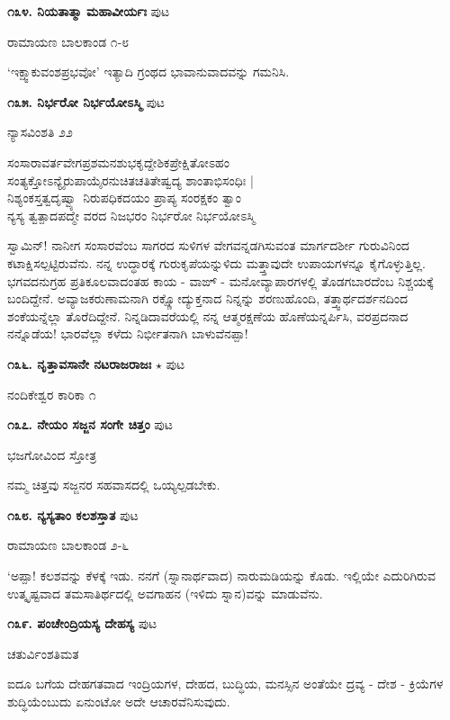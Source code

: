 \medskip
\noindent\textbf{೧೩೪. ನಿಯತಾತ್ಮಾ ಮಹಾವೀರ್ಯಃ} \hfill ಪುಟ \pageref{247b}

\hfill ರಾಮಾಯಣ ಬಾಲಕಾಂಡ ೧-೮

`ಇಕ್ಷ್ವಾಕುವಂಶಪ್ರಭವೋ' ಇತ್ಯಾದಿ ಗ್ರಂಥದ ಭಾವಾನುವಾದವನ್ನು ಗಮನಿಸಿ.

\medskip
\noindent\textbf{೧೩೫. ನಿರ್ಭರೋ ನಿರ್ಭಯೋಽಸ್ಮಿ} \hfill ಪುಟ \pageref{115}

\hfill ನ್ಯಾಸವಿಂಶತಿ ೨೨

\begin{shloka}
ಸಂಸಾರಾವರ್ತವೇಗಪ್ರಶಮನಶುಭಕೃದ್ದೇಶಿಕಪ್ರೇಕ್ಷಿತೋಽಹಂ\\
ಸಂತ್ಯಕ್ತೋಽನ್ಯೈರುಪಾಯೈರನುಚಿತಚತಿತೇಷ್ವದ್ಯ ಶಾಂತಾಭಿಸಂಧಿಃ |\\
ನಿಶ್ಯಂಕಸ್ತತ್ವದೃಷ್ವ್ಯಾ ನಿರುಪಧಿಕದಯಂ ಪ್ರಾಪ್ಯ ಸಂರಕ್ಷಕಂ ತ್ವಾಂ\\
ನ್ಯಸ್ಯ ತ್ವತ್ಪಾದಪದ್ಮೇ ವರದ ನಿಜಭರಂ ನಿರ್ಭರೋ ನಿರ್ಭಯೋಽಸ್ಮಿ \\
\end{shloka}

ಸ್ವಾಮಿನ್! ನಾನೀಗ ಸಂಸಾರವೆಂಬ ಸಾಗರದ ಸುಳಿಗಳ ವೇಗವನ್ನಡಗಿಸುವಂತ ಮಾರ್ಗದರ್ಶೀ ಗುರುವಿನಿಂದ ಕಟಾಕ್ಷಿಸಲ್ಪಟ್ಟಿರುವೆನು. ನನ್ನ ಉದ್ಧಾರಕ್ಕೆ ಗುರುಕೃಪೆಯನ್ನುಳಿದು ಮತ್ತ್ತಾವುದೇ ಉಪಾಯಗಳನ್ನೂ ಕೈಗೊಳ್ಳುತ್ತಿಲ್ಲ. ಭಗವದನುಗ್ರಹ ಪ್ರತಿಕೂಲವಾದಂತಹ ಕಾಯ - ವಾಙ್ - ಮನೋವ್ಯಾಪಾರಗಳಲ್ಲಿ ತೊಡಗಬಾರದೆಂಬ ನಿಶ್ಚಯಕ್ಕೆ ಬಂದಿದ್ದೇನೆ. ಅವ್ಯಾಜಕರುಣಾಮನಾಗಿ ರಕ್ಷ್ಣೋದ್ಯುಕ್ತನಾದ ನಿನ್ನನ್ನು ಶರಣುಹೊಂದಿ, ತತ್ತ್ವಾರ್ಥದರ್ಶನದಿಂದ ಶಂಕೆಯನ್ನೆಲ್ಲಾ ತೊರೆದಿದ್ದೇನೆ. ನಿನ್ನಡಿದಾವರೆಯಲ್ಲಿ ನನ್ನ ಆತ್ಮರಕ್ಷಣೆಯ ಹೊಣೆಯನ್ನರ್ಪಿಸಿ, ವರಪ್ರದನಾದ ನನ್ನೊಡೆಯ! ಭಾರವೆಲ್ಲಾ ಕಳೆದು ನಿರ್ಭೀತನಾಗಿ ಬಾಳುವೆನಪ್ಪಾ!

\medskip
\noindent\textbf{೧೩೬. ನೃತ್ತಾವಸಾನೇ ನಟರಾಜರಾಜಃ} $\star$ \hfill ಪುಟ \pageref{30}

\hfill ನಂದಿಕೇಶ್ವರ ಕಾರಿಕಾ ೧

\medskip
\noindent\textbf{೧೩೭. ನೇಯಂ ಸಜ್ಜನ ಸಂಗೇ ಚಿತ್ತಂ} \hfill ಪುಟ \pageref{83}

\hfill ಭಜಗೋವಿಂದ ಸ್ತೋತ್ರ

ನಮ್ಮ ಚಿತ್ತವು ಸಜ್ಜನರ ಸಹವಾಸದಲ್ಲಿ ಒಯ್ಯಲ್ಪಡಬೇಕು.

\medskip
\noindent\textbf{೧೩೮. ನ್ಯಸ್ಯತಾಂ ಕಲಶಸ್ತಾತ} \hfill ಪುಟ \pageref{198}

\hfill ರಾಮಾಯಣ ಬಾಲಕಾಂಡ ೨-೬

`ಅಪ್ಪಾ! ಕಲಶವನ್ನು ಕೆಳಕ್ಕೆ ಇಡು. ನನಗೆ (ಸ್ನಾನಾರ್ಥವಾದ) ನಾರುಮಡಿಯನ್ನು ಕೊಡು. ಇಲ್ಲಿಯೇ ಎದುರಿಗಿರುವ ಉತ್ಕೃಷ್ಟವಾದ ತಮಸಾತಿರ್ಥದಲ್ಲಿ ಅವಗಾಹನ (ಇಳಿದು ಸ್ನಾನ)ವನ್ನು ಮಾಡುವೆನು.

\medskip
\noindent\textbf{೧೩೯. ಪಂಚೇಂದ್ರಿಯಸ್ಯ ದೇಹಸ್ಯ} \hfill ಪುಟ \pageref{139b}

\hfill ಚತುರ್ವಿಂಶತಿಮತ

ಐದೂ ಬಗೆಯ ದೇಹಗತವಾದ ಇಂದ್ರಿಯಗಳ, ದೇಹದ, ಬುದ್ಧಿಯ, ಮನಸ್ಸಿನ ಅಂತೆಯೇ ದ್ರವ್ಯ - ದೇಶ - ಕ್ರಿಯೆಗಳ ಶುದ್ಧಿಯೆಂಬುದು ಏನುಂಟೋ ಅದೇ ಆಚಾರವೆನಿಸುವುದು. 

